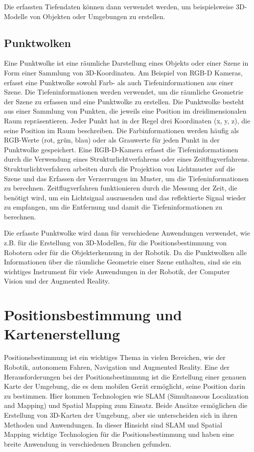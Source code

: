 Die erfassten Tiefendaten können dann verwendet werden, um beispielsweise 3D-Modelle von Objekten oder Umgebungen zu erstellen.

\subsection{Punktwolken}
Eine Punktwolke ist eine räumliche Darstellung eines Objekts oder einer Szene in Form einer Sammlung von 3D-Koordinaten. Am Beispiel von \ac{RGB-D} Kameras, erfasst eine Punktwolke sowohl Farb- als auch Tiefeninformationen aus einer Szene.
Die Tiefeninformationen werden verwendet, um die räumliche Geometrie der Szene zu erfassen und eine Punktwolke zu erstellen.
Die Punktwolke besteht aus einer Sammlung von Punkten, die jeweils eine Position im dreidimensionalen Raum repräsentieren. Jeder Punkt hat in der Regel drei Koordinaten (x, y, z), die seine Position im Raum beschreiben. Die Farbinformationen werden häufig als RGB-Werte (rot, grün, blau) oder als Grauwerte für jeden Punkt in der Punktwolke gespeichert.
Eine \ac{RGB-D}-Kamera erfasst die Tiefeninformationen durch die Verwendung eines Strukturlichtverfahrens oder eines Zeitflugverfahrens. Strukturlichtverfahren arbeiten durch die Projektion von Lichtmuster auf die Szene und das Erfassen der Verzerrungen im Muster, um die Tiefeninformationen zu berechnen. Zeitflugverfahren funktionieren durch die Messung der Zeit, die benötigt wird, um ein Lichtsignal auszusenden und das reflektierte Signal wieder zu empfangen, um die Entfernung und damit die Tiefeninformationen zu berechnen.

Die erfasste Punktwolke wird dann für verschiedene Anwendungen verwendet, wie z.B. für die Erstellung von 3D-Modellen, für die Positionsbestimmung von Robotern oder für die Objekterkennung in der Robotik. Da die Punktwolken alle Informationen über die räumliche Geometrie einer Szene enthalten, sind sie ein wichtiges Instrument für viele Anwendungen in der Robotik, der Computer Vision und der Augmented Reality.


\section{Positionsbestimmung und Kartenerstellung}
Positionsbestimmung ist ein wichtiges Thema in vielen Bereichen, wie der Robotik, autonomem Fahren, Navigation und Augmented Reality. Eine der Herausforderungen bei der Positionsbestimmung ist die Erstellung einer genauen Karte der Umgebung, die es dem mobilen Gerät ermöglicht, seine Position darin zu bestimmen. Hier kommen Technologien wie SLAM (Simultaneous Localization and Mapping) und Spatial Mapping zum Einsatz. Beide Ansätze ermöglichen die Erstellung von 3D-Karten der Umgebung, aber sie unterscheiden sich in ihren Methoden und Anwendungen. In dieser Hinsicht sind SLAM und Spatial Mapping wichtige Technologien für die Positionsbestimmung und haben eine breite Anwendung in verschiedenen Branchen gefunden.

